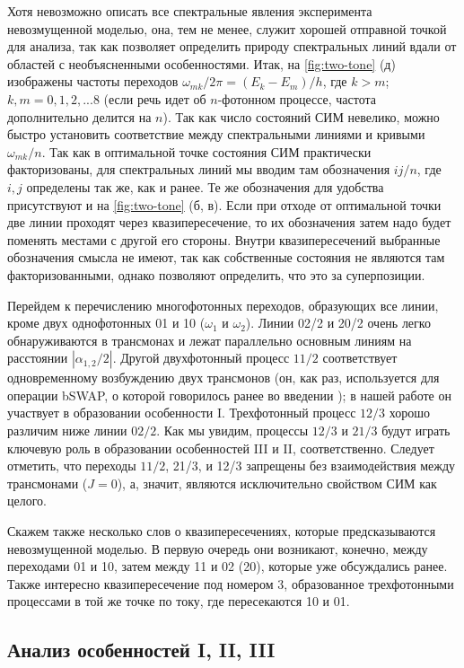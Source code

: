 \documentclass[14pt, a4paper]{extreport}
\numberwithin{equation}{section}
\begin{document}
Хотя невозможно описать все спектральные явления эксперимента невозмущенной моделью, она, тем не менее, служит хорошей отправной точкой для анализа, так как позволяет определить природу спектральных линий вдали от областей с необъясненными особенностями. Итак, на \autoref{fig:two-tone} (д) изображены частоты переходов $\omega_{mk}/2\pi = (E_k - E_m)/h$, где $k>m$; $k,m = 0,1,2,...8$ (если речь идет об $n$-фотонном процессе, частота дополнительно делится на $n$). Так как число состояний СИМ невелико, можно быстро установить соответствие между спектральными линиями и кривыми $\omega_{mk}/n$. Так как в оптимальной точке состояния СИМ практически факторизованы, для спектральных линий мы вводим там обозначения $ij/n$, где $i,j$ определены так же, как и ранее. Те же обозначения для удобства присутствуют и на \autoref{fig:two-tone} (б, в). Если при отходе от оптимальной точки две линии проходят через квазипересечение, то их обозначения затем надо будет поменять местами с другой его стороны. Внутри квазипересечений выбранные обозначения смысла не имеют, так как собственные состояния не являются там факторизованными, однако позволяют определить, что это за суперпозиции.

Перейдем к перечислению многофотонных переходов, образующих все линии, кроме двух однофотонных 01 и 10 ($\omega_{1}$ и $\omega_{2}$). Линии 02/2 и 20/2 очень легко обнаруживаются в трансмонах и лежат параллельно основным линиям на расстоянии $|\alpha_{1,2}/2|$. Другой двухфотонный процесс $11/2$ соответствует одновременному возбуждению двух трансмонов (он, как раз, используется для операции bSWAP, о которой говорилось ранее во введении \cite{poletto2012entanglement}); в нашей работе он участвует в образовании особенности I. Трехфотонный процесс $12/3$ хорошо различим ниже линии $02/2$. Как мы увидим, процессы $12/3$ и $21/3$ будут играть ключевую роль в образовании особенностей III и II, соответственно. Следует отметить, что переходы $11/2$, 21/3, и 12/3 запрещены без взаимодействия между трансмонами ($J=0$), а, значит, являются исключительно свойством СИМ как целого.

Скажем также несколько слов о квазипересечениях, которые предсказываются невозмущенной моделью. В первую очередь они возникают, конечно, между переходами 01 и 10, затем между 11 и 02 (20), которые уже обсуждались ранее. Также интересно квазипересечение под номером 3, образованное трехфотонными процессами в той же точке по току, где пересекаются 10 и 01.

\subsection{Анализ особенностей I, II, III}
\end{document}
